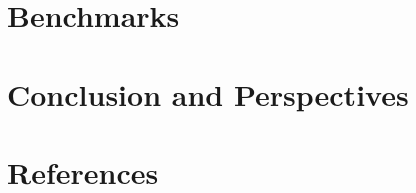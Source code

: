 \documentclass[11pt]{article}
\begin{document}

\section{Benchmarks}


\section{Conclusion and Perspectives}


\section*{References}



\end{document}
